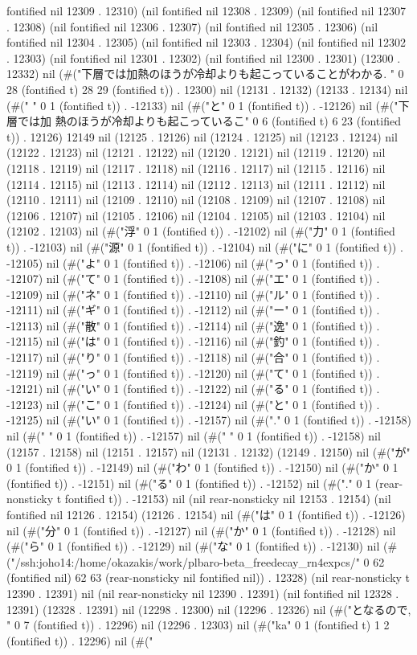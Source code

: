 fontified nil 12309 . 12310) (nil fontified nil 12308 . 12309) (nil fontified nil 12307 . 12308) (nil fontified nil 12306 . 12307) (nil fontified nil 12305 . 12306) (nil fontified nil 12304 . 12305) (nil fontified nil 12303 . 12304) (nil fontified nil 12302 . 12303) (nil fontified nil 12301 . 12302) (nil fontified nil 12300 . 12301) (12300 . 12332) nil (#("下層では加熱のほうが冷却よりも起こっていることがわかる.
" 0 28 (fontified t) 28 29 (fontified t)) . 12300) nil (12131 . 12132) (12133 . 12134) nil (#(" " 0 1 (fontified t)) . -12133) nil (#("と" 0 1 (fontified t)) . -12126) nil (#("下層では加
熱のほうが冷却よりも起こっているこ" 0 6 (fontified t) 6 23 (fontified t)) . 12126) 12149 nil (12125 . 12126) nil (12124 . 12125) nil (12123 . 12124) nil (12122 . 12123) nil (12121 . 12122) nil (12120 . 12121) nil (12119 . 12120) nil (12118 . 12119) nil (12117 . 12118) nil (12116 . 12117) nil (12115 . 12116) nil (12114 . 12115) nil (12113 . 12114) nil (12112 . 12113) nil (12111 . 12112) nil (12110 . 12111) nil (12109 . 12110) nil (12108 . 12109) nil (12107 . 12108) nil (12106 . 12107) nil (12105 . 12106) nil (12104 . 12105) nil (12103 . 12104) nil (12102 . 12103) nil (#("浮" 0 1 (fontified t)) . -12102) nil (#("力" 0 1 (fontified t)) . -12103) nil (#("源" 0 1 (fontified t)) . -12104) nil (#("に" 0 1 (fontified t)) . -12105) nil (#("よ" 0 1 (fontified t)) . -12106) nil (#("っ" 0 1 (fontified t)) . -12107) nil (#("て" 0 1 (fontified t)) . -12108) nil (#("エ" 0 1 (fontified t)) . -12109) nil (#("ネ" 0 1 (fontified t)) . -12110) nil (#("ル" 0 1 (fontified t)) . -12111) nil (#("ギ" 0 1 (fontified t)) . -12112) nil (#("ー" 0 1 (fontified t)) . -12113) nil (#("散" 0 1 (fontified t)) . -12114) nil (#("逸" 0 1 (fontified t)) . -12115) nil (#("は" 0 1 (fontified t)) . -12116) nil (#("釣" 0 1 (fontified t)) . -12117) nil (#("り" 0 1 (fontified t)) . -12118) nil (#("合" 0 1 (fontified t)) . -12119) nil (#("っ" 0 1 (fontified t)) . -12120) nil (#("て" 0 1 (fontified t)) . -12121) nil (#("い" 0 1 (fontified t)) . -12122) nil (#("る" 0 1 (fontified t)) . -12123) nil (#("こ" 0 1 (fontified t)) . -12124) nil (#("と" 0 1 (fontified t)) . -12125) nil (#("い" 0 1 (fontified t)) . -12157) nil (#("." 0 1 (fontified t)) . -12158) nil (#("
" 0 1 (fontified t)) . -12157) nil (#("
" 0 1 (fontified t)) . -12158) nil (12157 . 12158) nil (12151 . 12157) nil (12131 . 12132) (12149 . 12150) nil (#("が" 0 1 (fontified t)) . -12149) nil (#("わ" 0 1 (fontified t)) . -12150) nil (#("か" 0 1 (fontified t)) . -12151) nil (#("る" 0 1 (fontified t)) . -12152) nil (#("." 0 1 (rear-nonsticky t fontified t)) . -12153) nil (nil rear-nonsticky nil 12153 . 12154) (nil fontified nil 12126 . 12154) (12126 . 12154) nil (#("は" 0 1 (fontified t)) . -12126) nil (#("分" 0 1 (fontified t)) . -12127) nil (#("か" 0 1 (fontified t)) . -12128) nil (#("ら" 0 1 (fontified t)) . -12129) nil (#("な" 0 1 (fontified t)) . -12130) nil (#("/ssh:joho14:/home/okazakis/work/plbaro-beta_freedecay_rn4expcs/" 0 62 (fontified nil) 62 63 (rear-nonsticky nil fontified nil)) . 12328) (nil rear-nonsticky t 12390 . 12391) nil (nil rear-nonsticky nil 12390 . 12391) (nil fontified nil 12328 . 12391) (12328 . 12391) nil (12298 . 12300) nil (12296 . 12326) nil (#("となるので, " 0 7 (fontified t)) . 12296) nil (12296 . 12303) nil (#("ka" 0 1 (fontified t) 1 2 (fontified t)) . 12296) nil (#("
